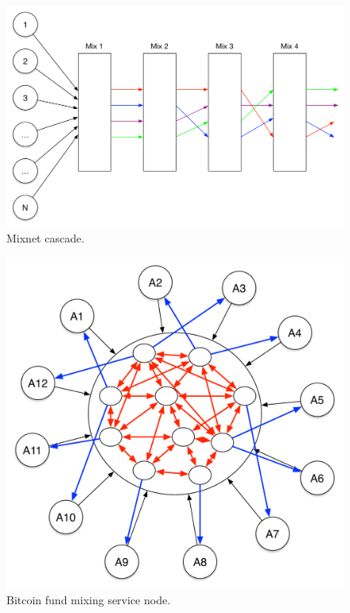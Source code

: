 \begin{figure}
\begin{center}
\includegraphics[scale=0.35]{images/mix_design.pdf}
\caption{Mixnet cascade.}
\label{fig:mix-design}
\end{center}
\end{figure}

\begin{figure}
\begin{center}
\includegraphics[scale=0.35]{images/mix_bitcoin.pdf}
\caption{Bitcoin fund mixing service node.}
\label{fig:mix-design}
\end{center}
\end{figure}

